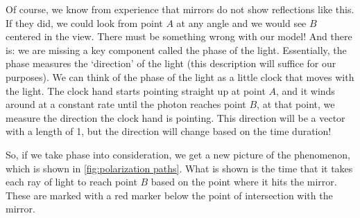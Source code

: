 Of course, we know from experience that mirrors do not show reflections like this. If they did, we could look from point $A$ at any angle and we would see $B$ centered in the view. There must be something wrong with our model! And there is: we are missing a key component called the phase of the light. Essentially, the phase measures the `direction' of the light (this description will suffice for our purposes). We can think of the phase of the light as a little clock that moves with the light. The clock hand starts pointing straight up at point $A$, and it winds around at a constant rate until the photon reaches point $B$, at that point, we measure the direction the clock hand is pointing. This direction will be a vector with a length of 1, but the direction will change based on the time duration!

So, if we take phase into consideration, we get a new picture of the phenomenon, which is shown in \autoref{fig:polarization paths}. What is shown is the time that it takes each ray of light to reach point $B$ based on the point where it hits the mirror. These are marked with a red marker below the point of intersection with the mirror.

